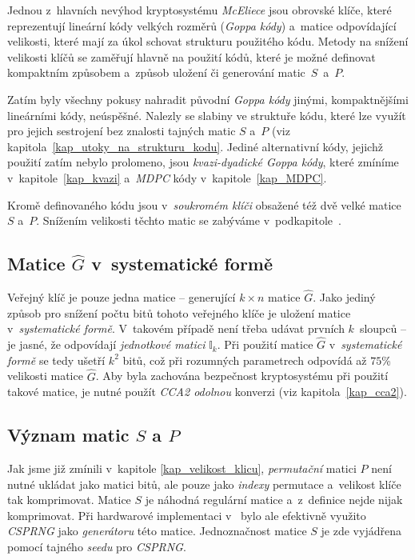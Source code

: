 \documentclass[thesis=M,czech,hidelinks]{FITthesis}[2012/06/26]
\newcommand{\0}{{\textcolor[gray]{0.75}{0}}}
\begin{document}
Jednou z~hlavních nevýhod kryptosystému \emph{McEliece} jsou obrovské klíče,
které reprezentují lineární kódy velkých rozměrů (\emph{Goppa kódy}) a~matice
odpovídající velikosti, které mají za úkol schovat strukturu použitého kódu.
Metody na snížení velikosti klíčů se zaměřují hlavně na použití kódů, které je
možné definovat kompaktním způsobem a~způsob uložení či generování
matic~$S$~a~$P$.

Zatím byly všechny pokusy nahradit původní \emph{Goppa kódy} jinými,
kompaktnějšími lineárními kódy, neúspěšné. Nalezly se slabiny ve struktuře kódu,
které lze využít pro jejich sestrojení bez znalosti tajných matic $S$ a~$P$ (viz
kapitola~\ref{kap_utoky_na_strukturu_kodu}. Jediné alternativní kódy, jejichž
použití zatím nebylo prolomeno, jsou \emph{kvazi-dyadické Goppa kódy}, které
zmíníme v~kapitole~\ref{kap_kvazi} a~\emph{MDPC} kódy v~kapitole~\ref{kap_MDPC}.

Kromě definovaného kódu jsou v~\emph{soukromém klíči} obsažené též dvě velké
matice $S$ a~$P$. Snížením velikosti těchto matic se zabýváme v~podkapitole~.


\subsection{Matice $\hat{G}$ v~systematické formě}

Veřejný klíč je pouze jedna matice --  generující $k \times n$
matice $\hat{G}$. Jako jediný způsob pro snížení počtu bitů tohoto veřejného
klíče je uložení matice v~\emph{systematické formě}. V~takovém případě není
třeba udávat prvních $k$~sloupců -- je jasné, že odpovídají \emph{jednotkové
matici} $\mathbb{I}_k$. Při použití matice $\hat{G}$ v~\emph{systematické formě}
se tedy ušetří $k^2$ bitů, což při rozumných parametrech odpovídá až $75$\;\%
velikosti matice $\hat{G}$. Aby byla zachována bezpečnost kryptosystému při
použití takové matice, je nutné použít \emph{CCA2 odolnou} konverzi (viz
kapitola~\ref{kap_cca2}).


\subsection{Význam matic $S$ a $P$}

Jak jsme již zmínili v~kapitole \ref{kap_velikost_klicu}, \emph{permutační}
matici $P$ není nutné ukládat jako matici bitů, ale pouze jako \emph{indexy}
permutace a~velikost klíče tak komprimovat. Matice $S$ je náhodná regulární
matice a~z~definice nejde nijak komprimovat. Při hardwarové implementaci
v~\cite{Paustjan} bylo ale efektivně využito \emph{CSPRNG} jako
\emph{generátoru} této matice. Jednoznačnost matice $S$ je zde vyjádřena pomocí
tajného \emph{seedu} pro \emph{CSPRNG}.
\end{document}
